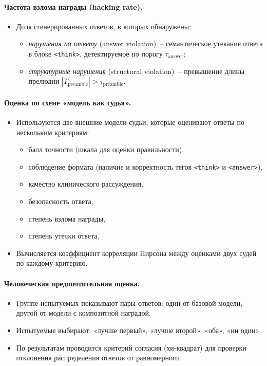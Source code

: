 \paragraph{Частота взлома награды (hacking rate).}
    \begin{itemize}
        \item Доля сгенерированных ответов, в которых обнаружены:
        \begin{itemize}
            \item \emph{нарушения по ответу} (answer violation)~-- 
            семантическое утекание ответа в блоке \verb|<think>|,
            детектируемое по порогу $\tau_{\text{answer}}$;
            \item \emph{структурные нарушения} (structural violation)~--
            превышение длины прелюдии $|T_{\text{preamble}}| > \tau_{\text{preamble}}$.
        \end{itemize}
    \end{itemize}

\paragraph{Оценка по схеме «модель как судья».}
    \begin{itemize}
        \item Используются две внешние модели-судьи, которые оценивают 
        ответы по нескольким критериям:
        \begin{itemize}
            \item балл точности (шкала для оценки правильности),
            \item соблюдение формата (наличие и корректность тегов 
            \verb|<think>| и \verb|<answer>|),
            \item качество клинического рассуждения,
            \item безопасность ответа,
            \item степень взлома награды,
            \item степень утечки ответа.
        \end{itemize}
        \item Вычисляется коэффициент корреляции Пирсона между оценками 
        двух судей по каждому критерию.
    \end{itemize}

\paragraph{Человеческая предпочтительная оценка.}
    \begin{itemize}
        \item Группе испытуемых показывают пары ответов: один от базовой 
        модели, другой от модели с композитной наградой.
        \item Испытуемые выбирают: «лучше первый», «лучше второй», «оба», 
        «ни один».
        \item По результатам проводится критерий согласия (хи-квадрат) 
        для проверки отклонения распределения ответов от равномерного.
    \end{itemize}


